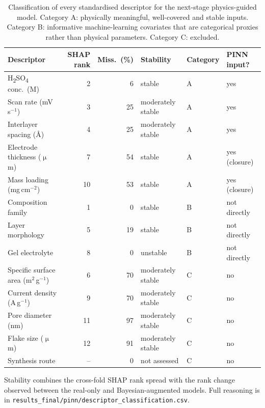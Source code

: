 \begin{table}[htbp]
\centering
\caption{Classification of every standardised descriptor for the next-stage physics-guided model. Category A: physically meaningful, well-covered and stable inputs. Category B: informative machine-learning covariates that are categorical proxies rather than physical parameters. Category C: excluded.}
\label{tab:pinn}
\footnotesize
\begin{tabular}{lrrlll}
\toprule
\textbf{Descriptor} & \textbf{SHAP rank} & \textbf{Miss.\ (\%)} & \textbf{Stability} & \textbf{Category} & \textbf{PINN input?} \\
\midrule
H\textsubscript{2}SO\textsubscript{4} conc.\ (M) & 2 & 6 & stable & A & yes \\
Scan rate (mV\,s$^{-1}$) & 3 & 25 & moderately stable & A & yes \\
Interlayer spacing (\AA) & 4 & 25 & moderately stable & A & yes \\
Electrode thickness ($\upmu$m) & 7 & 54 & stable & A & yes (closure) \\
Mass loading (mg\,cm$^{-2}$) & 10 & 53 & stable & A & yes (closure) \\
Composition family & 1 & 0 & stable & B & not directly \\
Layer morphology & 5 & 19 & stable & B & not directly \\
Gel electrolyte & 8 & 0 & unstable & B & not directly \\
Specific surface area (m$^2$\,g$^{-1}$) & 6 & 70 & moderately stable & C & no \\
Current density (A\,g$^{-1}$) & 9 & 70 & moderately stable & C & no \\
Pore diameter (nm) & 11 & 97 & moderately stable & C & no \\
Flake size ($\upmu$m) & 12 & 91 & moderately stable & C & no \\
Synthesis route & -- & 0 & not assessed & C & no \\
\bottomrule
\end{tabular}
\par\vspace{2pt}\begin{minipage}{\linewidth}\scriptsize Stability combines the cross-fold SHAP rank spread with the rank change observed between the real-only and Bayesian-augmented models. Full reasoning is in \texttt{results\_final/pinn/descriptor\_classification.csv}.\end{minipage}
\end{table}